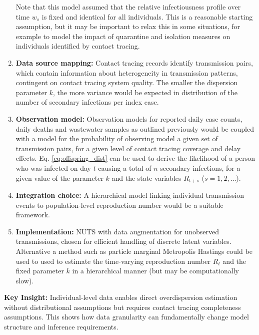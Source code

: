 \documentclass{article}
\begin{document}
\begin{enumerate}
    Note that this model assumed that the relative infectiousness profile over time $w_s$ is fixed and identical for all individuals. This is a reasonable starting assumption, but it may be important to relax this in some situations, for example to model the impact of quarantine and isolation measures on individuals identified by contact tracing.
    \item \textbf{Data source mapping:} Contact tracing records identify transmission pairs, which contain information about heterogeneity in transmission patterns, contingent on contact tracing system quality. The smaller the dispersion parameter $k$, the more variance would be expected in distribution of the number of secondary infections per index case.
    \item \textbf{Observation model:} Observation models for reported daily case counts, daily deaths and wastewater samples as outlined previously would be coupled with a model for the probability of observing model a given set of transmission pairs, for a given level of contact tracing coverage and delay effects. Eq. \eqref{eq:offspring_dist} can be used to derive the likelihood of a person who was infected on day $t$ causing a total of $n$ secondary infections, for a given value of the parameter $k$ and the state variables $R_{t+s}$ ($s=1,2,\ldots$). 
    \item \textbf{Integration choice:} A hierarchical model linking individual transmission events to population-level reproduction number would be a suitable framework.
    \item \textbf{Implementation:} NUTS with data augmentation for unobserved transmissions, chosen for efficient handling of discrete latent variables. Alternative a method such as particle marginal Metropolis Hastings could be used to used to estimate the time-varying reproduction number $R_t$ and the fixed parameter $k$ in a hierarchical manner (but may be computationally slow). 
\end{enumerate}

\textbf{Key Insight:} Individual-level data enables direct overdispersion estimation without distributional assumptions but requires contact tracing completeness assumptions. This shows how data granularity can fundamentally change model structure and inference requirements.
\end{document}
